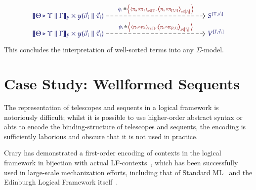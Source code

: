 \documentclass[11pt]{article}
\theoremstyle{definition}
\theoremstyle{remark}
\numberwithin{equation}{section}
\def\IModeColorName{MidnightBlue}
\def\OModeColorName{Maroon}
\newcommand\IMode[1]{{\color{\IModeColorName}{#1}}}
\newcommand\OMode[1]{{\color{\OModeColorName}{#1}}}
\newcommand\Pair[2]{\left\langle\,#1,#2\,\right\rangle}
\newcommand\Tuple[1]{\left\langle#1 \right\rangle}
\newcommand\Dom[1]{\left\vert#1\right\vert}
\newcommand\Define[2]{\IMode{#1}\triangleq\OMode{#2}}
\newcommand\SemBrackets[1]{\left\llbracket#1\right\rrbracket}
\newcommand\Yoneda[1]{\boldsymbol{y} (#1)}
\begin{document}
\begin{gather*}
  \begin{tikzcd}[cramped, ampersand replacement = \&]
    {\IMode{
      {\SemBrackets{\Theta\triangleright\Upsilon\parallel\Gamma}}_{P}
      \times
      \Yoneda{\vec{\sigma}_i\parallel\vec{\tau}_i}
    }}
      \arrow[
        , r
        , dashed
        , "
          \Define
            {
              \phi_i\,
            }
            {
              \,\Pair{
                \Tuple{\pi_u\circ\pi_1}_{u\in\Dom{\Upsilon}}
              }{
                \,\Tuple{\pi_u\circ\pi_{[2,1]}}_{u\in\Dom{\vec{\sigma}_i}}
              }
            }
          "
      ]
\&[12.0em]
    {\IMode{S^{\{\Upsilon,\vec{\sigma}_i\}}}}
\\[-1.0em]
    {\IMode{
      {\SemBrackets{
        \Theta\triangleright\Upsilon\parallel\Gamma
      }}_{P}
      \times
      \Yoneda{\vec{\sigma}_i\parallel\vec{\tau}_i}
    }}
      \arrow[
        , r
        , dashed
        , "
          \Define{
            \psi_i\,
          }{
            \,\Pair{
              \Tuple{\pi_x\circ\pi_1}_{x\in\Dom{\Gamma}}
            }{
              \,\Tuple{\pi_x\circ\pi_{[2,1]}}_{x\in\Dom{\vec{\tau}_i}}
            }
          }
          "
      ]
\&[12.0em]
    {\IMode{V^{[\Gamma,\vec{\tau}_i]}}}
  \end{tikzcd}
\end{gather*}

This concludes the interpretation of well-sorted terms into any $\Sigma$-model.

\section{Case Study: Wellformed Sequents}

The representation of telescopes and sequents in a logical framework is
notoriously difficult; whilst it is possible to use higher-order abstract syntax
or abts to encode the binding-structure of telescopes and sequents, the encoding
is sufficiently laborious and obscure that it is not used in practice.

Crary has demonstrated a first-order encoding of contexts in the logical
framework in bijection with actual LF-contexts~\cite{crary:2009}, which has been
successfully used in large-scale mechanization efforts, including that of
Standard ML~\cite{lee-crary-harper:2007} and the Edinburgh Logical Framework
itself~\cite{martens-crary:2012}.

\end{document}
